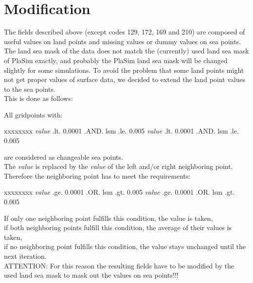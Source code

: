 \section{Modification}
The fields described above (except codes 129, 172, 169 and 210) are composed of useful values on land points
 and missing values or 
dummy values on sea points. The land sea mask of the data does not match the (currently) used 
land sea mask of PlaSim exactly, and probably the PlaSim land sea mask will be changed slightly for 
some simulations. To avoid the problem that some land points might not get proper values of surface data,
we decided to extend the land point values to the sea points.\\
This is done as follows:

\noindent All gridpoints with: \\
\vspace{-4.ex}
\begin{tabbing}
xxxxxxxx \= {\it value} .lt. 0.0001 {\small .AND.} lsm .le. 0.005 \kill
         \> {\it value} .lt. 0.0001 {\small .AND.} lsm .le. 0.005 \\
\end{tabbing}
\vspace{-4.ex}
are considered as changeable sea points.\\

\noindent The {\it value} is replaced by the {\it value} of the left and/or right neighboring point.
Therefore the neighboring point has to meet the requirements: \\
\vspace{-4.ex}
\begin{tabbing}
xxxxxxxx \= {\it value} .ge. 0.0001 {\small .OR.}  lsm .gt. 0.005 \kill
         \> {\it value} .ge. 0.0001 {\small .OR.}  lsm .gt. 0.005 \\
\end{tabbing}
\vspace{-4.ex}
If only one neighboring point fulfills this condition, the value is taken,\\     
if both neighboring points fulfill this condition, the average of their values is taken, \\    
if no neighboring point fulfills this condition, the value stays unchanged until the next iteration.\\     

ATTENTION: For this reason the resulting fields have to be modified by the used 
land sea mask to mask out the values on sea points!!!\\



